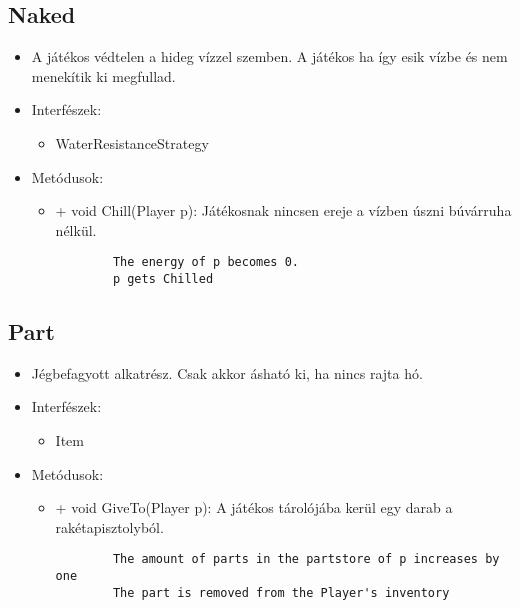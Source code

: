 \subsection{Naked}
\begin{itemize}
	\item A játékos védtelen a hideg vízzel szemben. A játékos ha így esik vízbe és nem menekítik ki megfullad.
	\item Interfészek:
	\begin{itemize}
		\item WaterResistanceStrategy
	\end{itemize}
	\item Metódusok:
	\begin{itemize}
		\item + void Chill(Player p): Játékosnak nincsen ereje a vízben úszni búvárruha nélkül.
		\begin{lstlisting}
		The energy of p becomes 0.
		p gets Chilled
		\end{lstlisting}
	\end{itemize}
\end{itemize}

\subsection{Part}
\begin{itemize}
	\item Jégbefagyott alkatrész. Csak akkor ásható ki, ha nincs rajta hó.
	\item Interfészek:
	\begin{itemize}
		\item Item
	\end{itemize}
	\item Metódusok:
	\begin{itemize}
		\item + void GiveTo(Player p): A játékos tárolójába kerül egy darab a rakétapisztolyból.
		\begin{lstlisting}
		The amount of parts in the partstore of p increases by one
		The part is removed from the Player's inventory
		\end{lstlisting}
	\end{itemize}
\end{itemize}

